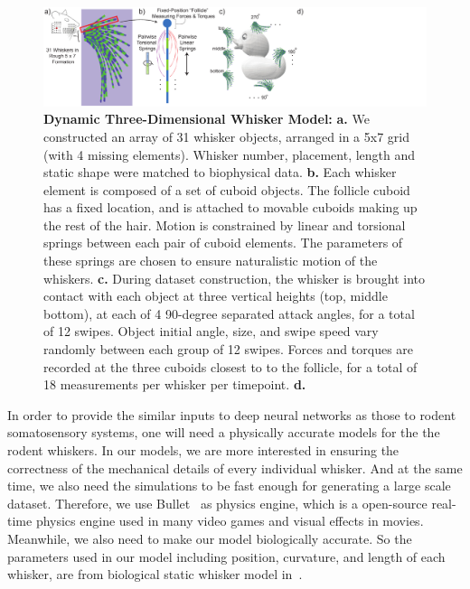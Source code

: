 \begin{figure}
\centering
\includegraphics [width=1\linewidth]{figures/whiskers.pdf}
\vspace{-2mm}
\caption{\textbf{Dynamic Three-Dimensional Whisker Model:} \textbf{a.} We constructed an array of 31 whisker objects, arranged in a 5x7 grid (with 4 missing elements).  Whisker number, placement, length and static shape were matched to biophysical data. \textbf{b.} Each whisker element is composed of a set of cuboid objects.  The follicle cuboid has a fixed location, and is attached to movable cuboids making up the rest of the hair. Motion is constrained by linear and torsional springs between each pair of cuboid elements.  The parameters of these springs are chosen to ensure naturalistic motion of the whiskers.  \textbf{c.} During dataset construction, the whisker is brought into contact with each object at three vertical heights (top, middle bottom), at each of 4 90-degree separated attack angles, for a total of 12 swipes.  Object initial angle, size, and swipe speed vary randomly between each group of 12 swipes.  Forces and torques are recorded at the three cuboids closest to to the follicle, for a total of 18 measurements per whisker per timepoint.  \textbf{d.} ~\label{fig_whiskers}}
\end{figure}

In order to provide the similar inputs to deep neural networks as those to rodent somatosensory systems, one will need a physically accurate models for the the rodent whiskers.
In our models, we are more interested in ensuring the correctness of the mechanical details of every individual whisker.
And at the same time, we also need the simulations to be fast enough for generating a large scale dataset.
Therefore, we use Bullet~\cite{wiki:bullet} as physics engine, which is a open-source real-time physics engine used in many video games and visual effects in movies.
Meanwhile, we also need to make our model biologically accurate. So the parameters used in our model including position, curvature, and length of each whisker, are from biological static whisker model in~\cite{Towal2011}.

